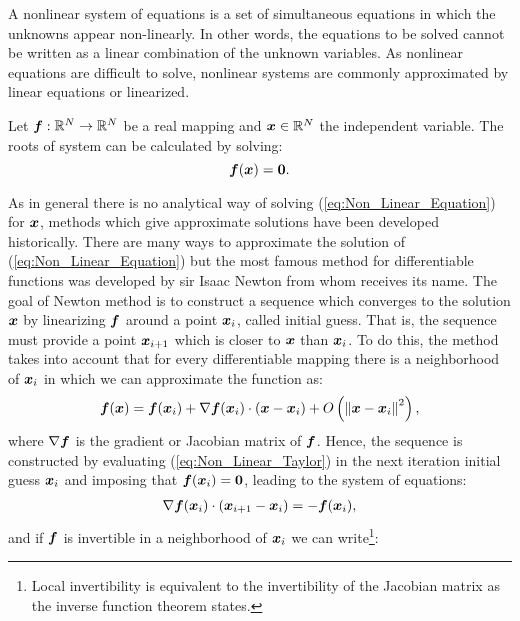 A nonlinear system of equations is a set of simultaneous equations in which the unknowns appear non-linearly. In other words, the equations to be solved cannot be written as a linear combination of the unknown variables. 
As nonlinear equations are difficult to solve, nonlinear systems are commonly approximated by linear equations or linearized. 
       
Let $\boldsymbol{f}: \mathbb{R}^N \rightarrow \mathbb{R}^N $ be a real mapping and $\boldsymbol{x}\in\mathbb{R}^N$ the independent variable. The roots of system can be calculated by solving:
      \begin{equation}
      	\boldsymbol{f}(\boldsymbol{x}) = \boldsymbol{0}.
      	\label{eq:Non_Linear_Equation}
      \end{equation}
      
As in general there is no analytical way of solving (\ref{eq:Non_Linear_Equation}) for $\boldsymbol{x}$, methods which give approximate solutions have been developed historically. There are many ways to approximate the solution of (\ref{eq:Non_Linear_Equation}) but the most famous method for differentiable functions was developed by sir Isaac Newton from whom receives its name. The goal of Newton method is to construct a sequence which converges to the solution $\boldsymbol{x}$ by linearizing $\boldsymbol{f}$ around a point $\boldsymbol{x}_i$, called initial guess. That is, the sequence must provide a point $\boldsymbol{x}_{i+1}$ which is closer to $\boldsymbol{x}$ than $\boldsymbol{x}_{i}$. To do this, the method takes into account that for every differentiable mapping there is a neighborhood of $\boldsymbol{x}_i$ in which we can approximate the function as:
      \begin{align}
      	\boldsymbol{f}(\boldsymbol{x}) 
      	= \boldsymbol{f}(\boldsymbol{x}_i) 
      	+ \nabla\boldsymbol{f}(\boldsymbol{x}_i)\cdot(\boldsymbol{x}-\boldsymbol{x}_i)
      	+ O\left(\norm{\boldsymbol{x}-\boldsymbol{x}_i}^2\right),
      	\label{eq:Non_Linear_Taylor}
      \end{align}
      where $\nabla \boldsymbol{f}$ is the gradient or Jacobian matrix of $\boldsymbol{f}$. Hence, the sequence is constructed by evaluating (\ref{eq:Non_Linear_Taylor}) in the next iteration initial guess $\boldsymbol{x}_{i}$ and imposing that $\boldsymbol{f}(\boldsymbol{x}_{i})=\boldsymbol{0}$, leading to the system of equations:
      \begin{align}
      \nabla\boldsymbol{f}(\boldsymbol{x}_i)\cdot(\boldsymbol{x}_{i+1}-\boldsymbol{x}_{i})
      =
      -\boldsymbol{f}(\boldsymbol{x}_i) ,
      \end{align}
      and if $\boldsymbol{f}$ is invertible in a neighborhood of $\boldsymbol{x}_i$ we can write\footnote{Local invertibility is equivalent to the invertibility of the Jacobian matrix as the inverse function theorem states.}:

